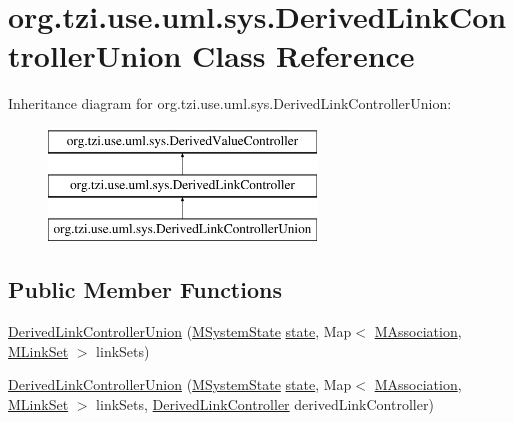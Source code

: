 \hypertarget{classorg_1_1tzi_1_1use_1_1uml_1_1sys_1_1_derived_link_controller_union}{\section{org.\-tzi.\-use.\-uml.\-sys.\-Derived\-Link\-Controller\-Union Class Reference}
\label{classorg_1_1tzi_1_1use_1_1uml_1_1sys_1_1_derived_link_controller_union}
}
Inheritance diagram for org.\-tzi.\-use.\-uml.\-sys.\-Derived\-Link\-Controller\-Union\-:\begin{figure}[H]
\begin{center}
\leavevmode
\includegraphics[height=3.000000cm]{classorg_1_1tzi_1_1use_1_1uml_1_1sys_1_1_derived_link_controller_union}
\end{center}
\end{figure}
\subsection*{Public Member Functions}
\begin{DoxyCompactItemize}
\item 
\hyperlink{classorg_1_1tzi_1_1use_1_1uml_1_1sys_1_1_derived_link_controller_union_aa3ccff7b6ec49c9883ef9d9ee8ac3495}{Derived\-Link\-Controller\-Union} (\hyperlink{classorg_1_1tzi_1_1use_1_1uml_1_1sys_1_1_m_system_state}{M\-System\-State} \hyperlink{classorg_1_1tzi_1_1use_1_1uml_1_1sys_1_1_derived_link_controller_a2870a3282e4dfeb13685cc71956abf78}{state}, Map$<$ \hyperlink{interfaceorg_1_1tzi_1_1use_1_1uml_1_1mm_1_1_m_association}{M\-Association}, \hyperlink{classorg_1_1tzi_1_1use_1_1uml_1_1sys_1_1_m_link_set}{M\-Link\-Set} $>$ link\-Sets)
\item 
\hyperlink{classorg_1_1tzi_1_1use_1_1uml_1_1sys_1_1_derived_link_controller_union_ac09f63865baa900562bf62a96d52cf42}{Derived\-Link\-Controller\-Union} (\hyperlink{classorg_1_1tzi_1_1use_1_1uml_1_1sys_1_1_m_system_state}{M\-System\-State} \hyperlink{classorg_1_1tzi_1_1use_1_1uml_1_1sys_1_1_derived_link_controller_a2870a3282e4dfeb13685cc71956abf78}{state}, Map$<$ \hyperlink{interfaceorg_1_1tzi_1_1use_1_1uml_1_1mm_1_1_m_association}{M\-Association}, \hyperlink{classorg_1_1tzi_1_1use_1_1uml_1_1sys_1_1_m_link_set}{M\-Link\-Set} $>$ link\-Sets, \hyperlink{classorg_1_1tzi_1_1use_1_1uml_1_1sys_1_1_derived_link_controller}{Derived\-Link\-Controller} derived\-Link\-Controller)
\end{DoxyCompactItemize}
